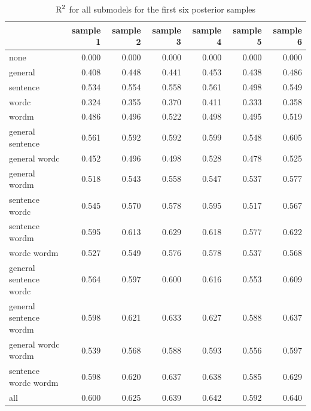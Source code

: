 \documentclass[11pt,a4paper,twoside]{book}\usepackage[]{graphicx}\usepackage[]{color}
\newenvironment{knitrout}{}{} %
\begin{document}
\begin{knitrout}
\color{fgcolor}\begin{table}

\caption{\label{tab:empirical.data.postsample3}$ \text{R}^2$ for all submodels for the first six posterior samples}
\centering
\begin{tabular}[t]{lrrrrrr}
\toprule
  & sample 1 & sample 2 & sample 3 & sample 4 & sample 5 & sample 6\\
\midrule
none & 0.000 & 0.000 & 0.000 & 0.000 & 0.000 & 0.000\\
general & 0.408 & 0.448 & 0.441 & 0.453 & 0.438 & 0.486\\
sentence & 0.534 & 0.554 & 0.558 & 0.561 & 0.498 & 0.549\\
wordc & 0.324 & 0.355 & 0.370 & 0.411 & 0.333 & 0.358\\
wordm & 0.486 & 0.496 & 0.522 & 0.498 & 0.495 & 0.519\\
general sentence & 0.561 & 0.592 & 0.592 & 0.599 & 0.548 & 0.605\\
general wordc & 0.452 & 0.496 & 0.498 & 0.528 & 0.478 & 0.525\\
general wordm & 0.518 & 0.543 & 0.558 & 0.547 & 0.537 & 0.577\\
sentence wordc & 0.545 & 0.570 & 0.578 & 0.595 & 0.517 & 0.567\\
sentence wordm & 0.595 & 0.613 & 0.629 & 0.618 & 0.577 & 0.622\\
wordc wordm & 0.527 & 0.549 & 0.576 & 0.578 & 0.537 & 0.568\\
general sentence wordc & 0.564 & 0.597 & 0.600 & 0.616 & 0.553 & 0.609\\
general sentence wordm & 0.598 & 0.621 & 0.633 & 0.627 & 0.588 & 0.637\\
general wordc wordm & 0.539 & 0.568 & 0.588 & 0.593 & 0.556 & 0.597\\
sentence wordc wordm & 0.598 & 0.620 & 0.637 & 0.638 & 0.585 & 0.629\\
all & 0.600 & 0.625 & 0.639 & 0.642 & 0.592 & 0.640\\
\bottomrule
\end{tabular}
\end{table}


\end{knitrout}
\end{document}
